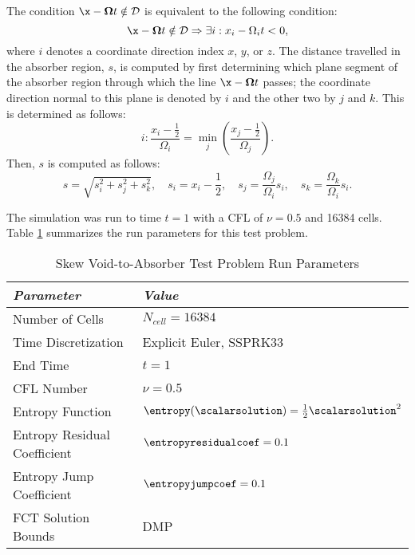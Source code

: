 The condition $\x-\mathbf{\Omega}t\notin\mathcal{D}$ is equivalent to the
following condition:
\[
   \x-\mathbf{\Omega}t\notin\mathcal{D} \Rightarrow
   \exists i: x_i-\Omega_i t < 0,
\]
where $i$ denotes a coordinate direction index $x$, $y$, or $z$.
The distance travelled in the absorber region, $s$, is computed
by first determining which plane segment of the absorber region
through which the line $\x-\mathbf{\Omega}t$ passes; the coordinate
direction normal to this plane is denoted by $i$ and the other
two by $j$ and $k$. This is determined as follows:
\[
   i: \frac{x_i-\frac{1}{2}}{\Omega_i} = \min\limits_j\left(
      \frac{x_j-\frac{1}{2}}{\Omega_j}\right).
\]
Then, $s$ is computed as follows:
\begin{equation}\label{eq:s_distance}
   s=\sqrt{s_i^2 + s_j^2 + s_k^2}, \quad
   s_i=x_i-\frac{1}{2}, \quad
   s_j=\frac{\Omega_j}{\Omega_i}s_i, \quad
   s_k=\frac{\Omega_k}{\Omega_i}s_i.
\end{equation}

The simulation was run to time $t=1$ with a CFL of $\nu=0.5$ and 16384 cells.
Table \ref{tab:skew_void_to_absorber_run_parameters} summarizes the run parameters
for this test problem.

\begin{table}[ht]\caption{Skew Void-to-Absorber Test Problem Run Parameters}
\label{tab:skew_void_to_absorber_run_parameters}
\centering
\begin{tabular}{l l}\toprule
\emph{Parameter} & \emph{Value}\\\midrule
Number of Cells & $N_{cell} = 16384$\\
Time Discretization & Explicit Euler, SSPRK33\\
End Time & $t = 1$\\
CFL Number & $\nu = 0.5$\\\midrule
Entropy Function & $\entropy(\scalarsolution) = \frac{1}{2}\scalarsolution^2$\\
Entropy Residual Coefficient & $\entropyresidualcoef = 0.1$\\
Entropy Jump Coefficient & $\entropyjumpcoef = 0.1$\\\midrule
FCT Solution Bounds & DMP\\
\bottomrule\end{tabular}
\end{table}

